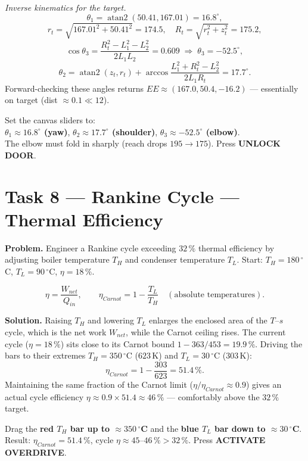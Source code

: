 \documentclass[11pt]{article}
\newcommand{\task}[2]{\section{Task #1 --- #2}}
\begin{document}
\emph{Inverse kinematics for the target.}
\[
\theta_1=\operatorname{atan2}(50.41,167.01)=16.8^{\circ},
\]
\[
r_t=\sqrt{167.01^2+50.41^2}=174.5,\quad
R_t=\sqrt{r_t^2+z_t^2}=175.2,
\]
\[
\cos\theta_3=\frac{R_t^2-L_1^2-L_2^2}{2L_1L_2}=0.609
\;\Rightarrow\;\theta_3=-52.5^{\circ},
\]
\[
\theta_2=\operatorname{atan2}(z_t,r_t)
+\arccos\!\frac{L_1^2+R_t^2-L_2^2}{2L_1R_t}=17.7^{\circ}.
\]
Forward-checking these angles returns $EE\approx(167.0,50.4,-16.2)$ ---
essentially on target (dist $\approx0.1\ll12$).

\begin{answer}
Set the canvas sliders to:\\
\textbf{$\theta_1\approx16.8^{\circ}$ (yaw)},\quad
\textbf{$\theta_2\approx17.7^{\circ}$ (shoulder)},\quad
\textbf{$\theta_3\approx-52.5^{\circ}$ (elbow)}.\\
The elbow must fold in sharply (reach drops $195\to175$). Press \textbf{UNLOCK DOOR}.
\end{answer}

\task{8}{Rankine Cycle --- Thermal Efficiency}
\textbf{Problem.} Engineer a Rankine cycle exceeding $32\,\%$ thermal
efficiency by adjusting boiler temperature $T_H$ and condenser temperature
$T_L$. Start: $T_H=180\,^{\circ}$C, $T_L=90\,^{\circ}$C, $\eta=18\,\%$.

\begin{relbox}
\[
\eta=\frac{W_{net}}{Q_{in}},\qquad
\eta_{Carnot}=1-\frac{T_L}{T_H}\quad(\text{absolute temperatures}).
\]
\end{relbox}

\textbf{Solution.} Raising $T_H$ and lowering $T_L$ enlarges the enclosed area
of the $T$--$s$ cycle, which is the net work $W_{net}$, while the Carnot
ceiling rises. The current cycle ($\eta=18\,\%$) sits close to its Carnot bound
$1-363/453=19.9\,\%$. Driving the bars to their extremes
$T_H=350\,^{\circ}$C ($623$\,K) and $T_L=30\,^{\circ}$C ($303$\,K):
\[
\eta_{Carnot}=1-\frac{303}{623}=51.4\,\%.
\]
Maintaining the same fraction of the Carnot limit
($\eta/\eta_{Carnot}\approx0.9$) gives an actual cycle efficiency
$\eta\approx0.9\times51.4\approx46\,\%$ --- comfortably above the $32\,\%$
target.

\begin{answer}
Drag the \textbf{red $T_H$ bar up to $\approx350\,^{\circ}$C} and the
\textbf{blue $T_L$ bar down to $\approx30\,^{\circ}$C}.\\
Result: $\eta_{Carnot}=51.4\,\%$, cycle $\eta\approx45$--$46\,\% > 32\,\%$.
Press \textbf{ACTIVATE OVERDRIVE}.
\end{answer}
\end{document}
